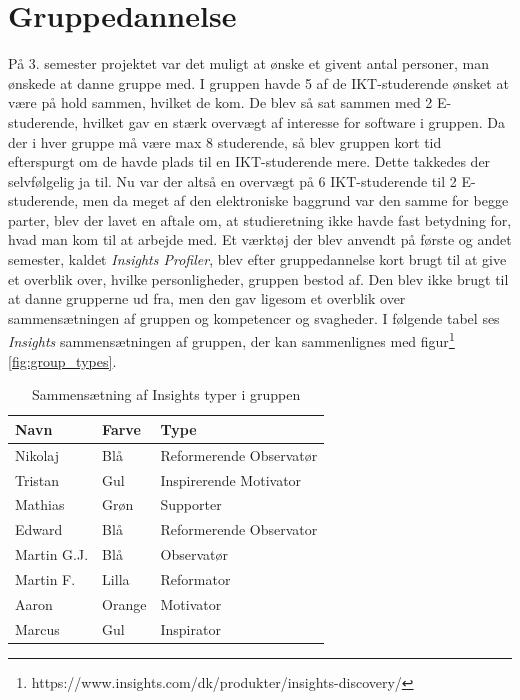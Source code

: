 \documentclass[a4paper,12pt,fleqn,oneside]{article}
\begin{document}
\section{Gruppedannelse}
På 3. semester projektet var det muligt at ønske et givent antal personer, man ønskede at danne gruppe med. I gruppen havde 5 af de IKT-studerende ønsket at være på hold sammen, hvilket de kom. De blev så sat sammen med 2 E-studerende, hvilket gav en stærk overvægt af interesse for software i gruppen. Da der i hver gruppe må være max 8 studerende, så blev gruppen kort tid efterspurgt om de havde plads til en IKT-studerende mere. Dette takkedes der selvfølgelig ja til. Nu var der altså en overvægt på 6 IKT-studerende til 2 E-studerende, men da meget af den elektroniske baggrund var  den samme for begge parter, blev der lavet en aftale om, at studieretning ikke havde fast betydning for, hvad man kom til at arbejde med. Et værktøj der blev anvendt på første og andet semester, kaldet \textit{Insights Profiler}, blev efter gruppedannelse kort brugt til at give et overblik over, hvilke personligheder, gruppen bestod af. Den blev ikke brugt til at danne grupperne ud fra, men den gav ligesom et overblik over sammensætningen af gruppen og kompetencer og svagheder. I
følgende tabel ses \textit{Insights} sammensætningen af gruppen, der kan sammenlignes med figur\footnote{https://www.insights.com/dk/produkter/insights-discovery/} \ref{fig:group_types}.
\begin{table}[H]
\centering
\begin{tabular}{|L{0.2\textwidth}|L{0.2\textwidth}|L{0.4\textwidth}|}
\hline
\textbf{Navn} & \textbf{Farve} & \textbf{Type} \\ \hline
Nikolaj & Blå & Reformerende Observatør  \\ \hline
Tristan & Gul & Inspirerende Motivator\\ \hline
Mathias & Grøn & Supporter \\ \hline
Edward & Blå & Reformerende Observator \\ \hline
Martin G.J. & Blå  & Observatør \\ \hline
Martin F. & Lilla & Reformator  \\ \hline
Aaron & Orange & Motivator \\ \hline
Marcus & Gul & Inspirator \\ \hline
\end{tabular}
\caption{Sammensætning af Insights typer i gruppen}
\label{table_group_types}
\end{table}
\end{document}

